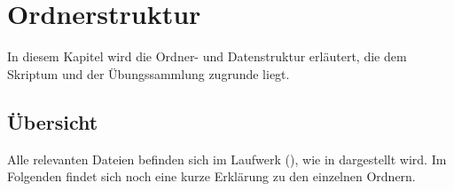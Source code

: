 \chapter{Ordnerstruktur}

In diesem Kapitel wird die Ordner- und Datenstruktur erläutert, die dem Skriptum
und der Übungssammlung zugrunde liegt.

\section{\"{U}bersicht}

Alle relevanten Dateien befinden sich im Laufwerk 
(), wie in  dargestellt wird.
Im Folgenden findet sich noch eine kurze Erklärung zu den einzelnen Ordnern.

